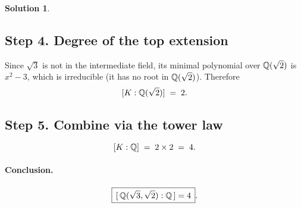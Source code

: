 \documentclass[12pt]{article}
\theoremstyle{definition} %
\newtheorem{solution}{Solution}
\theoremstyle{plain} %
\begin{document}
\begin{solution}
            \subsection*{Step 4.  Degree of the top extension}
            
            Since \(\sqrt{3}\) is not in the intermediate field,
            its minimal polynomial over \(\Bbb Q(\sqrt{2})\) is \(x^{2}-3\),
            which is irreducible (it has no root in \(\Bbb Q(\sqrt{2})\)).
            Therefore
            \[
              [K:\Bbb Q(\sqrt{2})]\;=\;2.
            \]
            
            \subsection*{Step 5.  Combine via the tower law}
            
            \[
              [K:\Bbb Q] \;=\; 2\times 2 \;=\; 4.
            \]
            
            \paragraph{Conclusion.}
            \[
              \boxed{\, [\,\Bbb Q(\sqrt{3},\sqrt{2}):\Bbb Q\,]=4 \, }.
            \]
            \end{solution}
\end{document}
